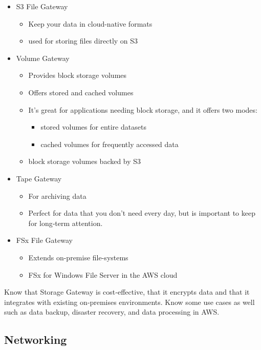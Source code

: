 \begin{itemize}
    \item S3 File Gateway
    \begin{itemize}
        \item Keep your data in cloud-native formats
        \item used for storing files directly on S3
    \end{itemize}
    \item Volume Gateway
    \begin{itemize}
        \item Provides block storage volumes
        \item Offers stored and cached volumes
        \item It's great for applications needing block storage, and it offers two modes:
        \begin{itemize}
            \item stored volumes for entire datasets
            \item cached volumes for frequently accessed data
        \end{itemize}
        \item block storage volumes backed by S3
    \end{itemize}
    \item Tape Gateway
    \begin{itemize}
        \item For archiving data
        \item Perfect for data that you don't need every day, but is important to keep for long‑term attention.
    \end{itemize}
    \item FSx File Gateway
    \begin{itemize}
        \item Extends on-premise file-systems
        \item FSx for Windows File Server in the AWS cloud
    \end{itemize}
\end{itemize}

Know that Storage Gateway is cost‑effective,
that it encrypts data and that it integrates with
existing on‑premises environments.
Know some use cases as well such as data backup,
disaster recovery, and data processing in AWS.

\subsection{Networking}

